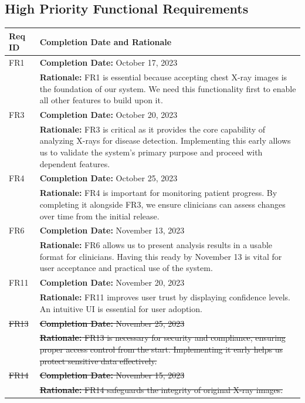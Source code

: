 \documentclass[12pt]{article}
\begin{document}
\subsection{High Priority Functional Requirements}
\begin{table}[H]
  \label{TblHighPriorityFRs}
  \begin{tabular}{p{}|p{}}
  \toprule
  \textbf{Req ID} & \textbf{Completion Date and Rationale} \\
  \midrule
  FR1 & \textbf{Completion Date:} October 17, 2023\\
      & \textbf{Rationale:} FR1 is essential because accepting chest X-ray images is the foundation of our system. We need this functionality first to enable all other features to build upon it. \\
  \midrule
  FR3 & \textbf{Completion Date:} October 20, 2023\\
      & \textbf{Rationale:} FR3 is critical as it provides the core capability of analyzing X-rays for disease detection. Implementing this early allows us to validate the system's primary purpose and proceed with dependent features. \\
  \midrule
  FR4 & \textbf{Completion Date:} October 25, 2023\\
      & \textbf{Rationale:} FR4 is important for monitoring patient progress. By completing it alongside FR3, we ensure clinicians can assess changes over time from the initial release. \\
  \midrule
  FR6 & \textbf{Completion Date:} November 13, 2023\\
      & \textbf{Rationale:} FR6 allows us to present analysis results in a usable format for clinicians. Having this ready by November 13 is vital for user acceptance and practical use of the system. \\
  \midrule
  FR11 & \textbf{Completion Date:} November 20, 2023\\
       & \textbf{Rationale:} FR11 improves user trust by displaying confidence levels. An intuitive UI is essential for user adoption. \\
  \midrule
   \sout{FR13}&  \sout{\textbf{Completion Date:} November 25, 2023}\\
       &  \sout{\textbf{Rationale:} FR13 is necessary for security and compliance, ensuring proper access control from the start. Implementing it early helps us protect sensitive data effectively.} \\
  \midrule
  \sout{FR14} & \sout{\textbf{Completion Date:} November 15, 2023}\\
       & \sout{\textbf{Rationale:} FR14 safeguards the integrity of original X-ray images.}\\
  \bottomrule
  \end{tabular}
  \end{table}
\end{document}
